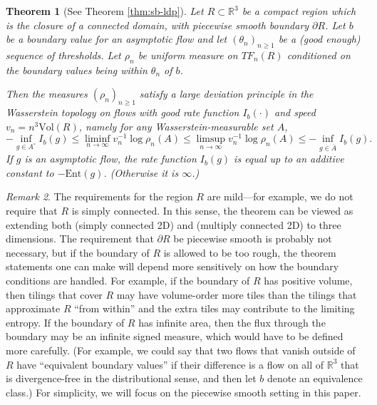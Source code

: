 \documentclass[11pt]{article}
\newtheorem{thm}{Theorem}[subsection]
\theoremstyle{remark}
\newtheorem{rem}[thm]{Remark}
\theoremstyle{definition}
\newcommand{\Ent}{\text{Ent}}
\newcommand{\m}[1]{\mathbb{#1}}
\begin{document}
\begin{thm}[See Theorem \ref{thm:sb-ldp}] \label{thm:roughmain}
Let $R\subset \m R^3$ be a compact region which is the closure of a connected domain, with piecewise smooth boundary $\partial R$. Let $b$ be a boundary value for an asymptotic flow and let $(\theta_n)_{n\geq 1}$ be a (good enough) sequence of thresholds. Let $\rho_n$ be uniform measure on $TF_n(R)$ conditioned on the boundary values being within $\theta_n$ of $b$. 

Then the measures $(\rho_n)_{n\geq 1}$ satisfy a large deviation principle in the Wasserstein topology on flows with good rate function $I_b(\cdot)$ and speed $v_n = n^3 \text{Vol}(R)$, namely for any Wasserstein-measurable set $A$,
    \begin{equation}\label{eq:ldp-prob-1}
    -\inf_{ g\in A^\circ} I_{ b}( g) \leq \liminf_{n\to \infty} v_n^{-1} \log \rho_n(A) \leq \limsup_{n\to \infty} v_n^{-1} \log \rho_n(A) \leq -\inf_{ g\in \overline{A}} I_{ b}( g).
\end{equation}
If $g$ is an asymptotic flow, the rate function $I_{ b}( g)$ is equal up to an additive constant to $-\Ent(g)$. (Otherwise it is $\infty$.)
\end{thm}

\begin{rem}
The requirements for the region $R$ are mild---for example, we do not require that $R$ is simply connected. In this sense, the theorem can be viewed as extending both \cite{cohn2001variational} (simply connected 2D) and \cite{kuchumov22} (multiply connected 2D) to three dimensions. The requirement that $\partial R$ be piecewise smooth is probably not necessary, but if the boundary of $R$ is allowed to be too rough, the theorem statements one can make will depend more sensitively on how the boundary conditions are handled. For example, if the boundary of $R$ has positive volume, then tilings that cover $R$ may have volume-order more tiles than the tilings that approximate $R$ ``from within'' and the extra tiles may contribute to the limiting entropy. If the boundary of $R$ has infinite area, then the flux through the boundary may be an infinite signed measure, which would have to be defined more carefully. (For example, we could say that two flows that vanish outside of $R$ have ``equivalent boundary values'' if their difference is a flow on all of $\mathbb R^3$ that is divergence-free in the distributional sense, and then let $b$ denote an equivalence class.) For simplicity, we will focus on the piecewise smooth setting in this paper.
\end{rem}
\end{document}
